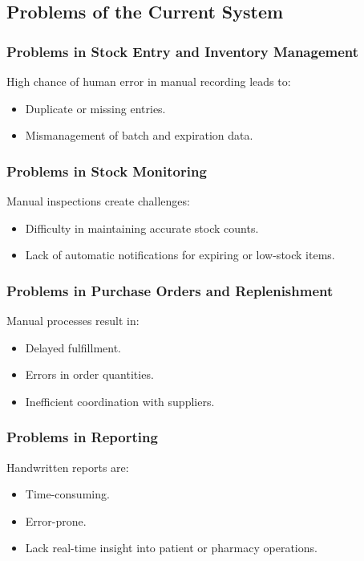 \documentclass[12pt,a4paper]{report}
\begin{document}
\subsection{Problems of the Current System}
\subsubsection{Problems in Stock Entry and Inventory Management}
High chance of human error in manual recording leads to:
\begin{itemize}
    \item Duplicate or missing entries.
    \item Mismanagement of batch and expiration data.
\end{itemize}

\subsubsection{Problems in Stock Monitoring}
Manual inspections create challenges:
\begin{itemize}
    \item Difficulty in maintaining accurate stock counts.
    \item Lack of automatic notifications for expiring or low-stock items.
\end{itemize}

\subsubsection{Problems in Purchase Orders and Replenishment}
Manual processes result in:
\begin{itemize}
    \item Delayed fulfillment.
    \item Errors in order quantities.
    \item Inefficient coordination with suppliers.
\end{itemize}

\subsubsection{Problems in Reporting}
Handwritten reports are:
\begin{itemize}
    \item Time-consuming.
    \item Error-prone.
    \item Lack real-time insight into patient or pharmacy operations.
\end{itemize}
\end{document}
